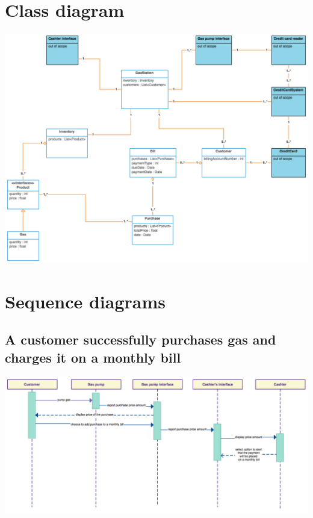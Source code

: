 \documentclass[11pt, a4paper]{article}
\begin{document}
\section{Class diagram}

\begin{center}
\centerline{\includegraphics[width=1.3\textwidth]{Class_diagram.pdf}}
\end{center}


\section{Sequence diagrams}

\subsection{A customer successfully purchases gas and charges it on a monthly bill}


\begin{center}
\includegraphics[width=17cm, angle=90]{SequenceDiagram_1_monthly_bill.pdf}
\end{center}
\end{document}

